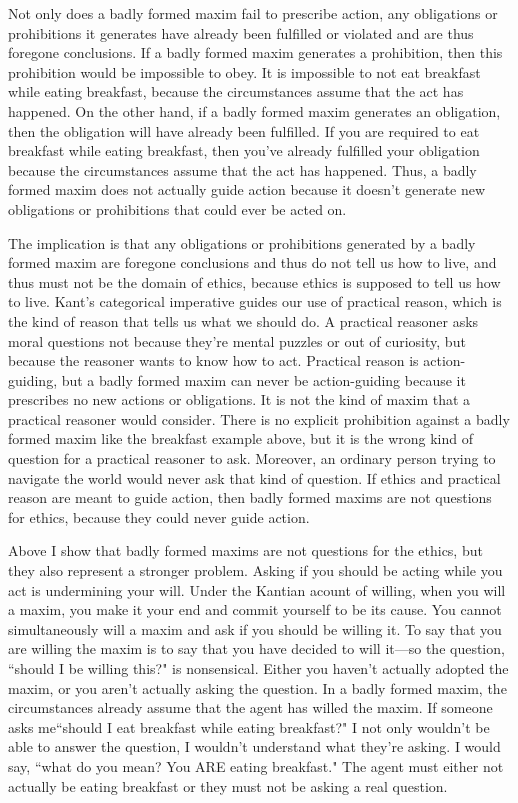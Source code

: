 \begin{isabellebody}
\begin{isamarkuptext}
Not only does a badly formed maxim fail to prescribe action, any obligations or prohibitions it 
generates have already been fulfilled or violated and are thus foregone conclusions. If a badly formed 
maxim generates a prohibition, then this prohibition would be impossible to obey. 
It is impossible to not eat breakfast while eating breakfast, because the circumstances assume that the 
act has happened. On the other hand, if a badly formed maxim generates an obligation, then the obligation 
will have already been fulfilled. If you are required to eat breakfast while eating breakfast, then you've 
already fulfilled your obligation because the circumstances assume that the act has happened. Thus, 
a badly formed maxim does not actually guide action because it doesn't generate new obligations or 
prohibitions that could ever be acted on. 

The implication is that any obligations or prohibitions generated by a badly formed maxim are foregone 
conclusions and thus do not tell us how to live, and thus must not be the domain of ethics, because 
ethics is supposed to tell us how to live. Kant's categorical imperative
 guides our use of practical reason, which is the kind of reason that tells us what we should do. 
A practical reasoner asks moral questions not because they're mental puzzles or out of curiosity, but 
because the reasoner wants to know how to act. Practical reason is action-guiding, but a badly formed
 maxim can never be action-guiding because it prescribes no new
actions or obligations. It is not the kind of maxim that a practical reasoner would consider. 
There is no explicit prohibition against a badly formed maxim like the breakfast example above, but it 
is the wrong kind of question for a practical reasoner to ask. Moreover, an ordinary person trying 
to navigate the world would never ask that kind of question. If ethics and practical reason are meant 
to guide action, then badly formed maxims are not questions for ethics, because they could never guide 
action.

Above I show that badly formed maxims are not questions for the ethics, but they also represent a 
stronger problem. Asking if you should be acting while you act is undermining your will. 
Under the Kantian acount of willing, when you will a maxim, you make it your end and commit yourself 
to be its cause. You cannot simultaneously will a maxim and ask if you should be willing it. To say that 
you are willing the maxim is to say that you have decided to will it—so the question, ``should I be 
willing this?" is nonsensical. Either you haven't actually adopted the maxim, or you aren't
actually asking the question. In a badly formed maxim, the circumstances already assume that the agent 
has willed the maxim. If someone asks me``should I eat breakfast while eating breakfast?" I not only 
wouldn't be able to answer the question, I wouldn't understand what they're asking. I would say, ``what 
do you mean? You ARE eating breakfast." The agent must either not actually be eating breakfast or 
they must not be asking a real question. 


\end{isamarkuptext}
\end{isabellebody}
